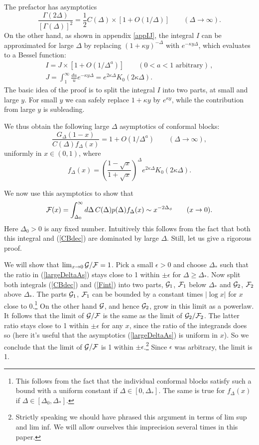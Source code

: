 \documentclass[12pt]{article}
\newcommand{\reef}[1]{(\ref{#1})}
\def\eps{\epsilon}
\newcommand{\beq}{\begin{equation}}
\newcommand{\eeq}{\end{equation}}
\def\calG {{\cal G}}
\def\calF {{\cal F}}
\def\half{{\textstyle\frac 12}}
\def\ge{\geqslant}
\def\eps{\epsilon}
\newcommand{\D}{\Delta}
\numberwithin{equation}{section}
\begin{document}
The prefactor has asymptotics
\beq
\frac{\Gamma(2\Delta)}{[\Gamma(\D)]^2} = \half C(\D)\times [1+O(1/\Delta)]\qquad(\D\to \infty).
\eeq
On the other hand, as shown in appendix \ref{appIJ}, the integral $I$ can be approximated for large $\Delta$ by replacing $(1+\kappa y)^{-\D}$ with $e^{-\kappa y \Delta}$, which evaluates to a Bessel function:
\begin{gather}
I = J\times[1+O(1/\Delta^{a})]\qquad(0<a<1\text{ arbitrary})\,,\label{IJ}\\
J = \int_1^\infty \frac{du}{u}e^{-\kappa y \D}= e^{2\kappa\D} K_0(2\kappa\D).
\end{gather}
The basic idea of the proof is to split the integral $I$ into two parts, at small and large $y$. For small $y$ we can safely replace $1+\kappa y$ by $e^{\kappa y}$, while the contribution from large $y$ is subleading.


We thus obtain the following large $\D$ asymptotics of conformal blocks:
\beq
\label{largeDeltaAs}
\frac{G_\D(1-x)}{C(\D)  f_\Delta(x)} = 1+O(1/\Delta^{a}) \qquad(\D\to \infty),
\eeq
uniformly in $x\in(0,1)$, where
\beq
\label{fD}
f_\D(x) = \left ( \frac{1-\sqrt{x}}{1+\sqrt{x}} \right ) ^\Delta 
e^{2\kappa\D} K_0(2\kappa\Delta).
\eeq

We now use this asymptotics to show that%
\beq
\label{Fint}
\calF(x) = \int _{\Delta_0}^\infty d\D\,C(\D) p(\D)f_\D(x)\sim x^{-2\D_\phi}\qquad (x\to 0).
\eeq
Here $\Delta_0>0$ is any fixed number. Intuitively this follows from the fact that both this integral and \reef{CBdec} are dominated by large $\D$. Still, let us give a rigorous proof. 

We will show that $\lim_{x\to 0} \calG/\calF =1$. Pick a small $\eps>0$ and choose $\Delta_*$ such that the ratio in \reef{largeDeltaAs} stays close to 1 within $\pm\eps$ for $\Delta\ge \Delta_*$. Now split both integrals \reef{CBdec} and \reef{Fint} into two parts, $\calG_1$, $\calF_1$ below $\Delta_*$ and $\calG_2$, $\calF_2$ above $\Delta_*$. The parts $\calG_1$, $\calF_1$ can be bounded by a constant times $|\log x|$ for $x$ close to 0.\footnote{This follows from the fact that the individual conformal blocks satisfy such a bound with a uniform constant if $\Delta\in[0,\Delta_*]$. The same is true for $f_\Delta(x)$ if $\Delta\in[\D_0,\Delta_*]$.} On the other hand $\calG$, and hence $\calG_2$, grow in this limit as a powerlaw. It follows that the limit of $\calG/\calF$ is the same as the limit of $\calG_2/\calF_2$. The latter ratio stays close to 1 within $\pm\eps$ for any $x$, since the ratio of the integrands does so (here it's useful that the asymptotics \reef{largeDeltaAs} is uniform in $x$). So we conclude that the limit of $\calG/\calF$ is 1 within $\pm\eps$.\footnote{Strictly speaking we should have phrased this argument in terms of lim sup and lim inf. We will allow ourselves this imprecision several times in this paper.} Since $\eps$ was arbitrary, the limit is 1.
\end{document}
